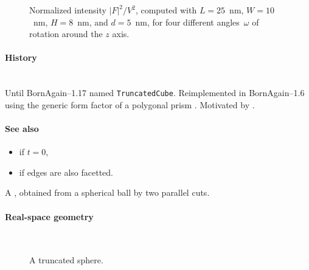 \begin{figure}[H]
\begin{center}
\end{center}
\caption{Normalized intensity $|F|^2/V^2$,
computed with $L=25$~nm, $W=10$~nm, $H=8$~nm, and $d=5$~nm,
for four different angles~$\omega$ of rotation around the $z$ axis.}
\end{figure}

\paragraph{History}\strut\\
Until BornAgain--1.17 named \texttt{TruncatedCube}.
Reimplemented in BornAgain--1.6 using the generic form factor
of a polygonal prism \cite{Wut17}.
Motivated by \cite{HeSS74}.

\paragraph{See also}
\begin{itemize}
\item {} if $t=0$,
\item {} if edges are also facetted.
\end{itemize}


\label{STruncatedSphere}

A , obtained from a spherical ball by two parallel cuts.

\paragraph{Real-space geometry}\strut\\

\begin{figure}[H]
\hfill
{}
\hfill
{}
\hfill
{}
\hfill
\caption{A truncated sphere.}
\end{figure}
\FloatBarrier

